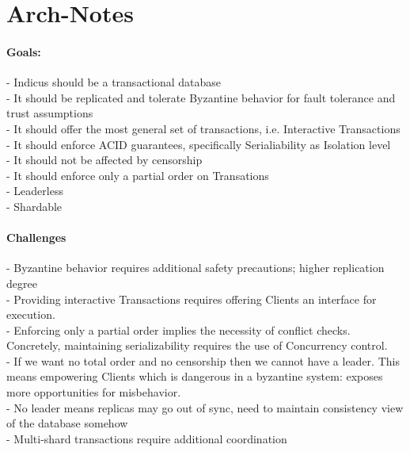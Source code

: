 \section{Arch-Notes}

\paragraph{Goals:}

- Indicus should be a transactional database\\
- It should be replicated and tolerate Byzantine behavior for fault tolerance and trust assumptions\\
- It should offer the most general set of transactions, i.e. Interactive Transactions\\
- It should enforce ACID guarantees, specifically Serialiability as Isolation level\\
- It should not be affected by censorship\\
- It should enforce only a partial order on Transations\\
- Leaderless\\
- Shardable\\

\paragraph{Challenges}
- Byzantine behavior requires additional safety precautions; higher replication degree\\
- Providing interactive Transactions requires offering Clients an interface for execution.\\
- Enforcing only a partial order implies the necessity of conflict checks. Concretely, maintaining serializability requires the use of Concurrency control.\\
- If we want no total order and no censorship then we cannot have a leader. This means empowering Clients which is dangerous in a byzantine system: exposes more opportunities for misbehavior.\\
- No leader means replicas may go out of sync, need to maintain consistency view of the database somehow\\
- Multi-shard transactions require additional coordination\\